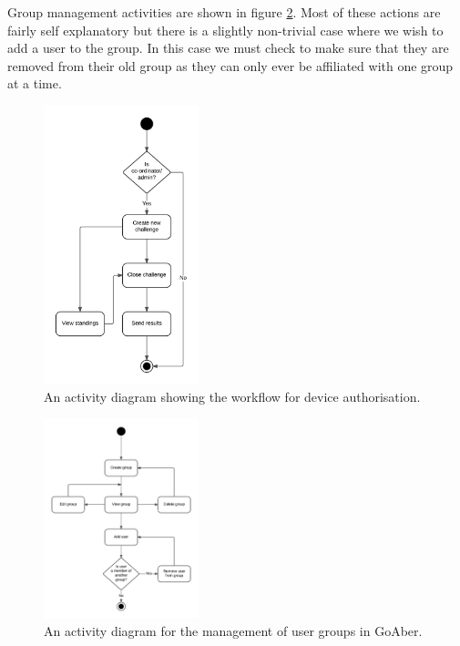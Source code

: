 Group management activities are shown in figure \ref{fig:activity-diagram-group-management}. Most of these actions are fairly self explanatory but there is a slightly non-trivial case where we wish to add a user to the group. In this case we must check to make sure that they are removed from their old group as they can only ever be affiliated with one group at a time.

\begin{figure}[H]
\centering
\includegraphics[width=0.4\textwidth]{../design/UML/StateActivity/Creating-Closing-Challenges.png}
\caption{An activity diagram showing the workflow for device authorisation.}
\label{fig:activity-diagram-device-authorisation}
\end{figure}

\begin{figure}[H]
\centering
\includegraphics[width=0.4\textwidth]{../design/UML/StateActivity/Groups-Management.png}
\caption{An activity diagram for the management of user groups in GoAber.}
\label{fig:activity-diagram-group-management}
\end{figure}

